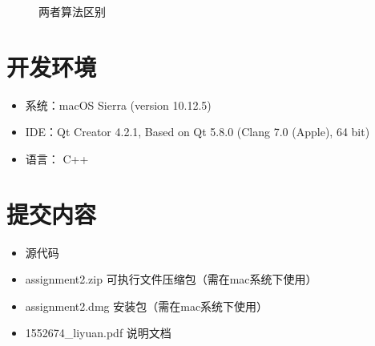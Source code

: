 \documentclass{article}
\begin{document}
\begin{CJK}{UTF8}{gbsn}
\begin{figure}[!h]
  \caption{两者算法区别}
  \label{fig:subfig} %
 \end{figure}

\vspace{3em}
\section{开发环境}
\begin{itemize}
	\item 系统：macOS Sierra (version 10.12.5)
	\item IDE：Qt Creator 4.2.1, Based on Qt 5.8.0 (Clang 7.0 (Apple), 64 bit)
	\item 语言： C++
\end{itemize}

\vspace{3em}
\section{提交内容}
\begin{itemize}
	\item 源代码
	\item assignment2.zip 可执行文件压缩包（需在mac系统下使用）
	\item assignment2.dmg 安装包（需在mac系统下使用）
	\item 1552674\_liyuan.pdf 说明文档
\end{itemize}

\end{CJK}
\end{document}

